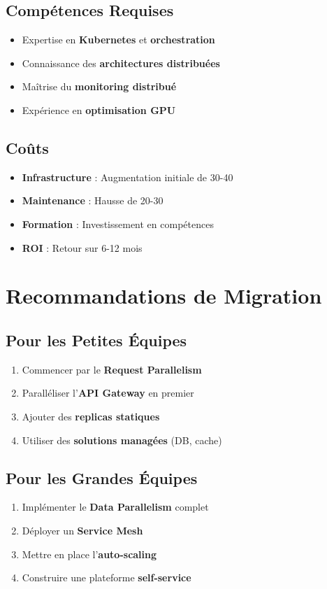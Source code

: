 \documentclass[12pt,a4paper]{article}
\begin{document}
\subsection{Compétences Requises}
\begin{itemize}
\item Expertise en \textbf{Kubernetes} et \textbf{orchestration}
\item Connaissance des \textbf{architectures distribuées}
\item Maîtrise du \textbf{monitoring distribué}
\item Expérience en \textbf{optimisation GPU}
\end{itemize}

\subsection{Coûts}
\begin{itemize}
\item \textbf{Infrastructure} : Augmentation initiale de 30-40%
\item \textbf{Maintenance} : Hausse de 20-30%
\item \textbf{Formation} : Investissement en compétences
\item \textbf{ROI} : Retour sur 6-12 mois
\end{itemize}

\section{Recommandations de Migration}

\subsection{Pour les Petites Équipes}
\begin{enumerate}
\item Commencer par le \textbf{Request Parallelism}
\item Paralléliser l'\textbf{API Gateway} en premier
\item Ajouter des \textbf{replicas statiques}
\item Utiliser des \textbf{solutions managées} (DB, cache)
\end{enumerate}

\subsection{Pour les Grandes Équipes}
\begin{enumerate}
\item Implémenter le \textbf{Data Parallelism} complet
\item Déployer un \textbf{Service Mesh}
\item Mettre en place l'\textbf{auto-scaling}
\item Construire une plateforme \textbf{self-service}
\end{enumerate}
\end{document}
